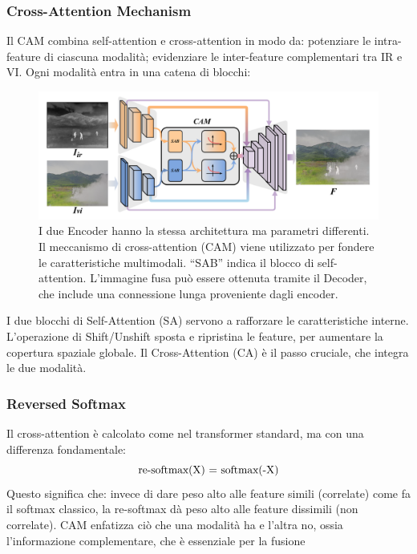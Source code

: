 \subsubsection{Cross-Attention Mechanism}
Il CAM combina self-attention e cross-attention in modo da: potenziare le intra-feature di ciascuna modalità; evidenziare le inter-feature complementari tra IR e VI.
Ogni modalità entra in una catena di blocchi:
\begin{figure}[H]
  \centering
  \includegraphics[width=1.0\textwidth]{utils/blocchi.png}
  \caption{I due Encoder hanno la stessa architettura ma parametri differenti. 
  Il meccanismo di cross-attention (CAM) viene utilizzato per fondere le caratteristiche multimodali. 
  “SAB” indica il blocco di self-attention. L’immagine fusa può essere ottenuta tramite il Decoder, 
  che include una connessione lunga proveniente dagli encoder.}
  \label{fig:blocchi}
\end{figure}
I due blocchi di Self-Attention (SA) servono a rafforzare le caratteristiche interne.
L’operazione di Shift/Unshift sposta e ripristina le feature, per aumentare la copertura spaziale globale.
Il Cross-Attention (CA) è il passo cruciale, che integra le due modalità.
\subsubsection{Reversed Softmax}
Il cross-attention è calcolato come nel transformer standard, ma con una differenza fondamentale:
\[
    \makebox[\textwidth][c]{%
      $\displaystyle
        \text{re-softmax(X) = softmax(-X)}
      $%
    }
\]
Questo significa che: invece di dare peso alto alle feature simili (correlate) come fa il softmax classico, 
la re-softmax dà peso alto alle feature dissimili (non correlate). 
CAM enfatizza ciò che una modalità ha e l’altra no, ossia l’informazione complementare, che è essenziale per la fusione

